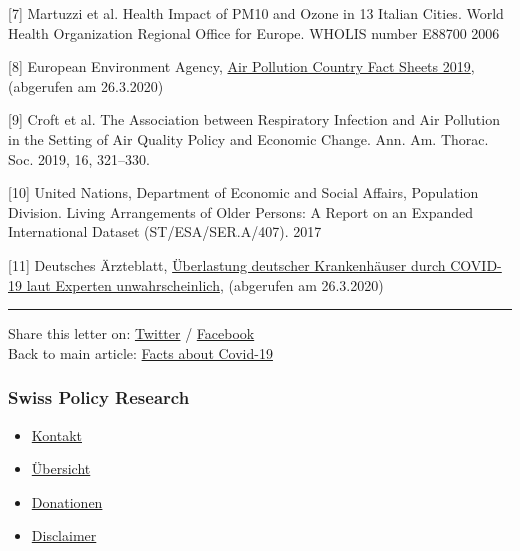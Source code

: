 {[}7{]} Martuzzi et al. Health Impact of PM10 and Ozone in 13 Italian
Cities. World Health Organization Regional Office for Europe. WHOLIS
number E88700 2006

{[}8{]} European Environment Agency,
\href{https://www.eea.europa.eu/themes/air/country-fact-sheets/2019-country-fact-sheets}{Air
Pollution Country Fact Sheets 2019}, (abgerufen am 26.3.2020)

{[}9{]} Croft et al. The Association between Respiratory Infection and
Air Pollution in the Setting of Air Quality Policy and Economic Change.
Ann. Am. Thorac. Soc. 2019, 16, 321--330.

{[}10{]} United Nations, Department of Economic and Social Affairs,
Population Division. Living Arrange­ments of Older Persons: A Report on
an Expanded International Dataset (ST/ESA/SER.A/407). 2017

{[}11{]} Deutsches Ärzteblatt,
\href{https://www.aerzteblatt.de/nachrichten/111029/Ueberlastung-deutscher-Krankenhaeuser-durch-COVID-19-laut-Experten-unwahrscheinlich}{Überlastung
deutscher Krankenhäuser durch COVID-19 laut Experten unwahrscheinlich},
(abgerufen am 26.3.2020)

\begin{center}\rule{0.5\linewidth}{\linethickness}\end{center}

Share this letter on:
\href{https://twitter.com/intent/tweet?url=https://swprs.org/professor-bhakdi-open-letter-greek/}{Twitter}
/
\href{https://www.facebook.com/share.php?u=https://swprs.org/professor-bhakdi-open-letter-greek/}{Facebook}\\
Back to main article:
\href{https://swprs.org/a-swiss-doctor-on-covid-19/}{Facts about
Covid-19}

\hypertarget{swiss-policy-research}{%
\subsubsection{Swiss Policy Research}\label{swiss-policy-research}}

\begin{itemize}
\tightlist
\item
  \href{https://swprs.org/kontakt/}{Kontakt}
\item
  \href{https://swprs.org/uebersicht/}{Übersicht}
\item
  \href{https://swprs.org/donationen/}{Donationen}
\item
  \href{https://swprs.org/disclaimer/}{Disclaimer}
\end{itemize}

